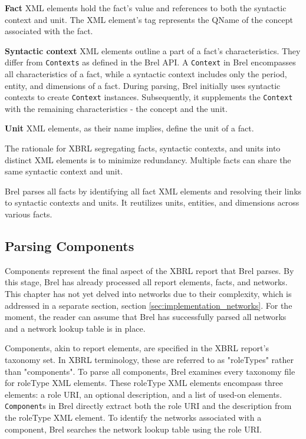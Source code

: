 \textbf{Fact} XML elements hold the fact's value and references to both the syntactic context and unit.
The XML element's tag represents the QName of the concept associated with the fact.

\textbf{Syntactic context} XML elements outline a part of a fact's characteristics.
They differ from \texttt{Contexts} as defined in the Brel API.
A \texttt{Context} in Brel encompasses all characteristics of a fact, while a syntactic context includes only the period, entity, and dimensions of a fact.
During parsing, Brel initially uses syntactic contexts to create \texttt{Context} instances.
Subsequently, it supplements the \texttt{Context} with the remaining characteristics - the concept and the unit.

\textbf{Unit} XML elements, as their name implies, define the unit of a fact.

The rationale for XBRL segregating facts, syntactic contexts, and units into distinct XML elements is to minimize redundancy.
Multiple facts can share the same syntactic context and unit.

Brel parses all facts by identifying all fact XML elements and resolving their links to syntactic contexts and units.
It reutilizes units, entities, and dimensions across various facts.

\subsection{Parsing Components}
\label{sec:implementation_components}

Components represent the final aspect of the XBRL report that Brel parses.
By this stage, Brel has already processed all report elements, facts, and networks.
This chapter has not yet delved into networks due to their complexity, which is addressed in a separate section, section \ref{sec:implementation_networks}.
For the moment, the reader can assume that Brel has successfully parsed all networks and a network lookup table is in place.

Components, akin to report elements, are specified in the XBRL report's taxonomy set.
In XBRL terminology, these are referred to as "roleTypes" rather than "components".
To parse all components, Brel examines every taxonomy file for roleType XML elements.
These roleType XML elements encompass three elements: a role URI, an optional description, and a list of used-on elements.
\texttt{Component}s in Brel directly extract both the role URI and the description from the roleType XML element.
To identify the networks associated with a component, Brel searches the network lookup table using the role URI.

